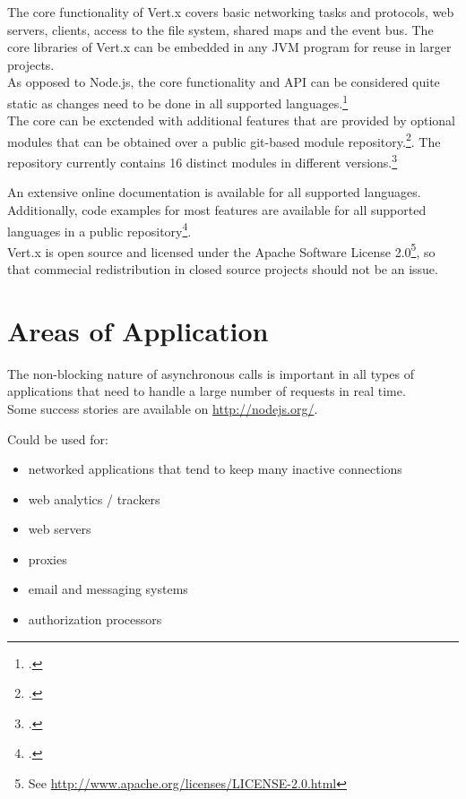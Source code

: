The core functionality of Vert.x covers basic networking tasks and protocols,
web servers, clients, access to the file system, shared maps and the event bus.
The core libraries of Vert.x can be embedded in any JVM program for reuse in
larger projects.\\
As opposed to Node.js, the core functionality and API can be considered quite
static as changes need to be done in all supported
languages.\footcite[Cf.][]{vertx_2012}\\ %
The core can be exctended with additional features that are provided by optional
modules that can be obtained over a public git-based module
repository.\footcite[Cf.][]{vertx_mod_2012}.
The repository currently contains 16 distinct modules in different
versions.\footcite[Cf.][]{Vertx_repository_2012}

An extensive online documentation is available for all supported languages.
Additionally, code examples for most features are available for all supported languages in
a public repository\footcite[Cf.][]{Fox_2013}.\\
Vert.x is open source and licensed under the Apache Software License
2.0\footnote{See \url{http://www.apache.org/licenses/LICENSE-2.0.html}}, so that
commecial redistribution in closed source projects should not be an issue.





\section{Areas of Application}
\label{areas_of_application}

The non-blocking nature of asynchronous calls is important in all types of
applications that need to handle a large number of requests in real time.\\
Some success stories are available on \url{http://nodejs.org/}.

Could be used for: 
\begin{itemize}
  \item networked applications that tend to keep many inactive connections
  \item web analytics / trackers
  \item web servers
  \item proxies
  \item email and messaging systems
  \item authorization processors
\end{itemize}

